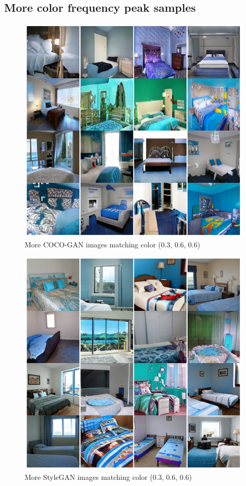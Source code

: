 \documentclass{article}
\begin{document}
    \subsection{More color frequency peak samples}
    \begin{figure}[H]
          \centering
          \includegraphics[scale=0.4]{color-images/coco_more_peak_images.png}
          \caption{More COCO-GAN images matching color (0.3, 0.6, 0.6)}
    \end{figure}
       \begin{figure}[H]
          \centering
          \includegraphics[scale=0.4]{color-images/style_more_peak_images.png}
          \caption{More StyleGAN images matching color (0.3, 0.6, 0.6)}
    \end{figure}
    \newpage
\end{document}

